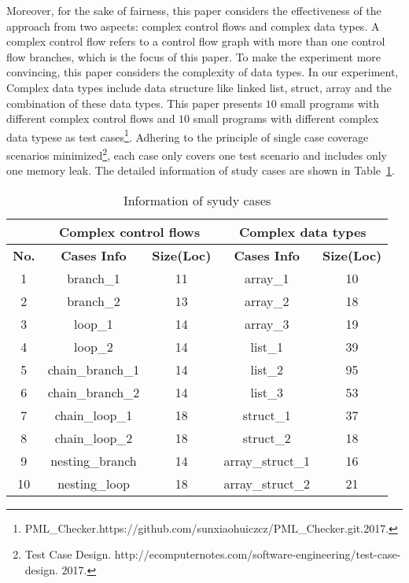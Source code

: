 Moreover, for the sake of fairness, this paper considers the effectiveness of the approach from two aspects: complex control flows and complex data types. A complex control flow refers to a control flow graph with more than one control flow branches, which is the focus of this paper. To make the experiment more convincing, this paper considers the complexity of data types. In our experiment, Complex data types include data structure like linked list, struct, array and the combination of these data types. This paper presents $10$ small programs with different complex control flows and $10$ small programs with different complex data typese as test cases\protect\footnote{PML\_Checker.https://github.com/sunxiaohuiczcz/PML\_Checker.git.2017.}. Adhering to the principle of single case coverage scenarios minimized\footnote{Test Case Design. http://ecomputernotes.com/software-engineering/test-case-design. 2017.}, each case only covers one test scenario and includes only one memory leak.
The detailed information of study cases are shown in Table~\ref{tab:2}.
%
\begin{table}[!h]
\center
\caption{Information of syudy cases}\label{tab:2}
\begin{tabular}{|c|c|c|c|c|}
\hline
&\multicolumn{2}{|c|}{\textbf{Complex control flows}} & \multicolumn{2}{|c|}{\textbf{Complex data types}}\\
\hline
\textbf{No.} & \textbf{Cases Info} & \textbf{Size(Loc)} & \textbf{Cases Info} & \textbf{Size(Loc)}\\
\hline
1 & branch\_1 & 11 & array\_1 & 10\\
\hline
2 & branch\_2 & 13 & array\_2 &	18\\
\hline
3 & loop\_1 & 14 & array\_3 & 19\\
\hline
4 & loop\_2 & 14 &	list\_1 &	39\\
\hline
5 & chain\_branch\_1 & 14 &	list\_2 &	95\\
\hline
6 & chain\_branch\_2 & 14 &	list\_3 &	53\\
\hline
7 &  chain\_loop\_1 & 18 &	struct\_1 &	37\\
\hline
8 & chain\_loop\_2 & 18 &	struct\_2 &	18\\
\hline
9 &	nesting\_branch & 14 &array\_struct\_1 &	16\\
\hline
10 & nesting\_loop & 18 & array\_struct\_2 &	21\\
\hline
\end{tabular}
\end{table}
%
